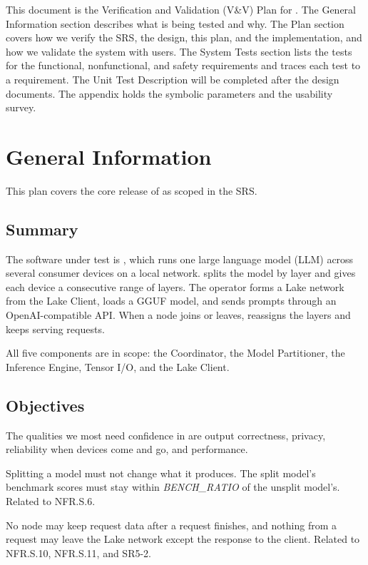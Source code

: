 \documentclass[12pt, titlepage]{article}
\begin{document}
\newpage


This document is the Verification and Validation (V\&V) Plan for \progname{}.
The General Information section describes what is being tested and why. The
Plan section covers how we verify the SRS, the design, this plan, and the
implementation, and how we validate the system with users. The System Tests
section lists the tests for the functional, nonfunctional, and safety
requirements and traces each test to a requirement. The Unit Test Description
will be completed after the design documents. The appendix holds the symbolic
parameters and the usability survey.

\section{General Information}

This plan covers the core release of \progname{} as scoped in the SRS.

\subsection{Summary}

The software under test is \progname{}, which runs one large language model
(LLM) across several consumer devices on a local network. \progname{} splits
the model by layer and gives each device a consecutive range of layers. The
operator forms a Lake network from the Lake Client, loads a
GGUF model, and sends prompts through an OpenAI-compatible API. When a node
joins or leaves, \progname{} reassigns the layers and keeps serving requests.

All five components are in scope: the Coordinator, the Model Partitioner, the
Inference Engine, Tensor I/O, and the Lake Client.

\subsection{Objectives}

The qualities we most need confidence in are output correctness, privacy,
reliability when devices come and go, and performance.

Splitting a model must not change what it produces. The split model's
benchmark scores must stay within \textit{BENCH\_RATIO} of the unsplit
model's. Related to NFR.S.6.

No node may keep request data after a request finishes, and nothing from a request may
leave the Lake network except the response to the client. Related to
NFR.S.10, NFR.S.11, and SR5-2.
\end{document}
